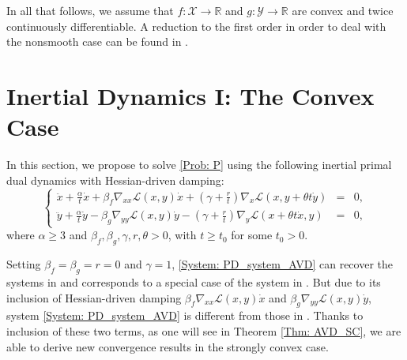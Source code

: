 \documentclass[pdflatex,sn-mathphys-num]{sn-jnl}
\theoremstyle{thmstyleone}
\theoremstyle{thmstyletwo}
\theoremstyle{thmstylethree}
\newcommand{\R}{\mathbb{R}}
\newcommand{\X}{\mathcal{X}}
\newcommand{\Y}{\mathcal{Y}}
\begin{document}
In all that follows, we assume that $f:\X\to\R$ and $g:\Y\to\R$ are convex and twice continuously differentiable. A reduction to the first order in order to deal with the nonsmooth case can be found in \cite{Attouch_2016_Hessian}.

\section{Inertial Dynamics I: The Convex Case}\label{Sec: PD-AVD-H}
In this section, we propose to solve \eqref{Prob: P} using the following inertial primal dual dynamics with Hessian-driven damping:
\begin{equation}\label{System: PD_system_AVD}\tag{PD-AVD-H}
\left\{
\begin{array}{lcl}
\ddot{x} + \frac{\alpha}{t}\dot{x} + \beta_f\nabla_{xx}\mathcal{L}(x,y)\dot{x} + \left( \gamma + \frac{r}{t} \right) \nabla_x \mathcal{L}(x,y+\theta t \dot{y}) &=& 0,\\[4pt]
\ddot{y} + \frac{\alpha}{t}\dot{y} - \beta_g\nabla_{yy}\mathcal{L}(x,y)\dot{y} - \left( \gamma + \frac{r}{t} \right) \nabla_y \mathcal{L}(x+\theta t\dot{x},y) &=& 0,
\end{array} 
\right.
\end{equation} 
where $\alpha\ge 3$ and $\beta_f,\beta_g,\gamma,r,\theta>0$, with $t\ge t_0$ for some $t_0>0$.

Setting $\beta_f=\beta_g=r=0$ and $\gamma=1$, \eqref{System: PD_system_AVD} can recover the systems in \cite{Zeng_2020,Ding_2025,He_2026_bilinear} and corresponds to a special case of the system in \cite{He_2024_bilinear}. But due to its inclusion of Hessian-driven damping $\beta_f\nabla_{xx}\mathcal{L}(x,y)\dot{x}$ and $\beta_g\nabla_{yy}\mathcal{L}(x,y)\dot{y}$, system \eqref{System: PD_system_AVD} is different from those in \cite{Zeng_2020,Ding_2025,He_2024_bilinear,He_2026_bilinear}. Thanks to inclusion of these two terms, as one will see in Theorem \ref{Thm: AVD_SC}, we are able to derive new convergence results in the strongly convex case.    




\end{document}
